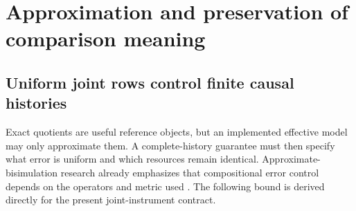 

\section{Approximation and preservation of comparison meaning}\label{sec:approximation}
\subsection{Uniform joint rows control finite causal histories}
Exact quotients are useful reference objects, but an implemented effective model may only approximate them. A complete-history guarantee must then specify what error is uniform and which resources remain identical. Approximate-bisimulation research already emphasizes that compositional error control depends on the operators and metric used \cite{GeblerTini2013}. The following bound is derived directly for the present joint-instrument contract.

